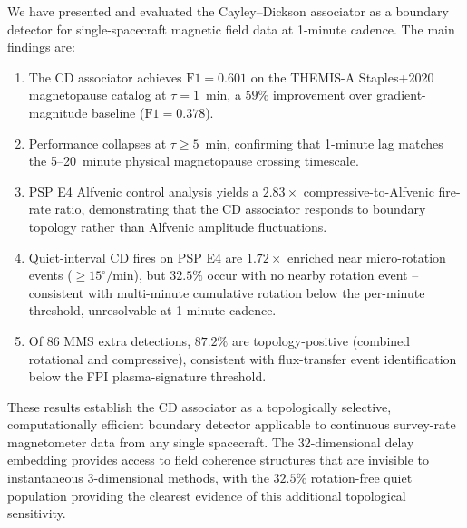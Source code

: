 \documentclass[draft]{agujournal2025}
\begin{document}
We have presented and evaluated the Cayley--Dickson associator as a
boundary detector for single-spacecraft magnetic field data at 1-minute cadence.
The main findings are:

\begin{enumerate}
  \item The CD associator achieves $\mathrm{F1}=0.601$ on the THEMIS-A
    Staples+2020 magnetopause catalog at $\tau=1$~min, a $59\%$ improvement
    over gradient-magnitude baseline ($\mathrm{F1}=0.378$).

  \item Performance collapses at $\tau \geq 5$~min, confirming that
    1-minute lag matches the 5--20~minute physical magnetopause crossing
    timescale.

  \item PSP E4 Alfvenic control analysis yields a $2.83\times$
    compressive-to-Alfvenic fire-rate ratio, demonstrating that the
    CD associator responds to boundary topology rather than Alfvenic
    amplitude fluctuations.

  \item Quiet-interval CD fires on PSP E4 are $1.72\times$ enriched near
    micro-rotation events ($\geq 15^\circ/\mathrm{min}$), but $32.5\%$
    occur with no nearby rotation event -- consistent with multi-minute
    cumulative rotation below the per-minute threshold, unresolvable at
    1-minute cadence.

  \item Of 86 MMS extra detections, $87.2\%$ are topology-positive
    (combined rotational and compressive), consistent with flux-transfer
    event identification below the FPI plasma-signature threshold.
\end{enumerate}

These results establish the CD associator as a topologically selective,
computationally efficient boundary detector applicable to continuous
survey-rate magnetometer data from any single spacecraft.
The 32-dimensional delay embedding provides access to field coherence
structures that are invisible to instantaneous 3-dimensional methods,
with the $32.5\%$ rotation-free quiet population providing the clearest
evidence of this additional topological sensitivity.

\end{document}

